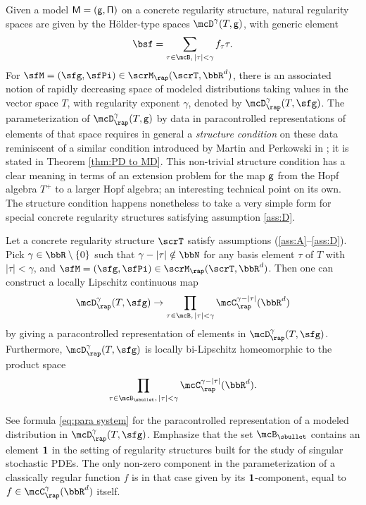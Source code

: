 Given a model $\sf M=(g,\Pi)$ on a concrete regularity structure, natural regularity spaces are given by the Hölder-type spaces $\mcD^\gamma(T,\sf g)$, with generic element
\[
\bsf = \sum_{\tau\in\mcB,\, \vert\tau\vert < \gamma} f_\tau \tau.
\]
For $\sfM=(\sfg,\sfPi)\in\scrM_\rap(\scrT, \bbR^d)$, there is an associated notion of rapidly decreasing space of modeled distributions taking values in the vector space $T$, with regularity exponent $\gamma$, denoted by $\mcD_\rap^\gamma(T, \sfg)$. The parameterization of $\mcD_\rap^\gamma(T,\sf g)$ by data in paracontrolled representations of elements of that space requires in general a {\it structure condition} on these data reminiscent of a similar condition introduced by Martin and Perkowski in \cite{MP18}; it is stated in Theorem \ref{thm:PD to MD}. This non-trivial structure condition has a clear meaning in terms of an extension problem for the map $\sf g$ from the Hopf algebra $T^+$ to a larger Hopf algebra; an interesting technical point on its own. The structure condition happens nonetheless to take a very simple form for special concrete regularity structures satisfying assumption \eqref{ass:D}.

\begin{thm} \label{mainthm2}
Let a concrete regularity structure $\scrT$ satisfy assumptions \textup{(\ref{ass:A}--\ref{ass:D})}. Pick $\gamma\in\bbR\setminus\{0\}$ such that $\gamma-|\tau|\notin\bbN$ for any basis element $\tau$ of $T$ with $|\tau|<\gamma$, and $\sfM=(\sfg,\sfPi)\in\scrM_\rap(\scrT, \bbR^d)$. Then one can construct a locally Lipschitz continuous map\vspace*{-3pt}
\[
\mcD_\rap^\gamma(T,\sfg) \to \prod_{\tau\in\mcB,\, |\tau|<\gamma} \mcC_\rap^{\gamma-|\tau|}(\bbR^d)
\]
by giving a paracontrolled representation of elements in $\mcD_\rap^\gamma(T,\sfg)$. Furthermore, $\mcD_\rap^\gamma(T, \sfg)$ is locally bi-Lipschitz homeomorphic to the product space\vspace*{-3pt}\enlargethispage{.5\baselineskip}%
\[
\prod_{\tau\in\mcB_\sbullet,\, |\tau|<\gamma} \mcC_\rap^{\gamma-|\tau|}(\bbR^d).
\]
\end{thm}

See formula \eqref{eq:para system} for the paracontrolled representation of a modeled distribution in $\mcD_\rap^\gamma(T,\sfg)$. Emphasize that the set $\mcB_\sbullet$ contains an element $\bf 1$ in the setting of regularity structures built for the study of singular stochastic PDEs. The only non-zero component in the parameterization of a classically regular function $f$ is in that case given by its $\bf 1$-component, equal to $f\in\mcC^\gamma_\rap(\bbR^d)$ itself.


